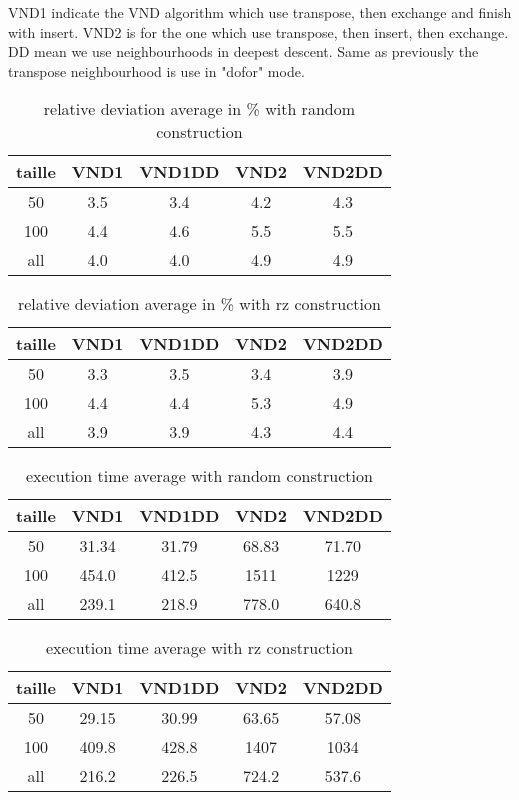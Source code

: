 \documentclass[12pt,a4paper]{article}
\begin{document}
VND1 indicate the VND algorithm which use transpose, then exchange and finish with insert. VND2 is for the one which use transpose, then insert, then exchange. DD mean we use neighbourhoods in deepest descent. Same as previously the transpose neighbourhood is use in "dofor" mode.

\begin{table}[!h]
\centering
\begin{tabular}{|*{5}{c|}}
  \hline
  taille & VND1 & VND1DD & VND2 & VND2DD\\
  \hline
  50 & 3.5 & 3.4 & 4.2 & 4.3 \\ 
  100 & 4.4 & 4.6 & 5.5 & 5.5 \\
  all & 4.0 & 4.0 & 4.9 & 4.9 \\
  \hline
\end{tabular}
\caption{relative deviation average in \% with random construction}
\label{relative deviation of VND with random construction}
\end{table}

\begin{table}[!h]
\centering
\begin{tabular}{|*{5}{c|}}
  \hline
  taille & VND1 & VND1DD & VND2 & VND2DD\\
  \hline
  50 & 3.3 & 3.5 & 3.4 & 3.9 \\ 
  100 & 4.4 & 4.4 & 5.3 & 4.9 \\
  all & 3.9 & 3.9 & 4.3 & 4.4 \\
  \hline
\end{tabular}
\caption{relative deviation average in \% with rz construction}
\label{relative deviation of VND with rz construction}
\end{table}

\begin{table}[!h]
\centering
\begin{tabular}{|*{5}{c|}}
  \hline
  taille & VND1 & VND1DD & VND2 & VND2DD\\
  \hline
  50 & 31.34 & 31.79 & 68.83 & 71.70 \\ 
  100 & 454.0 & 412.5 & 1511 & 1229 \\
  all & 239.1 & 218.9 & 778.0 & 640.8 \\
  \hline
\end{tabular}
\caption{execution time average with random construction}
\label{execution time of VND with random construction}
\end{table}

\begin{table}[!h]
\centering
\begin{tabular}{|*{5}{c|}}
  \hline
  taille & VND1 & VND1DD & VND2 & VND2DD\\
  \hline
  50 & 29.15 & 30.99 & 63.65 & 57.08 \\ 
  100 & 409.8 & 428.8 & 1407 & 1034 \\
  all & 216.2 & 226.5 & 724.2 & 537.6 \\
  \hline
\end{tabular}
\caption{execution time average with rz construction}
\label{execution time of VND with rz construction}
\end{table}
\end{document}
